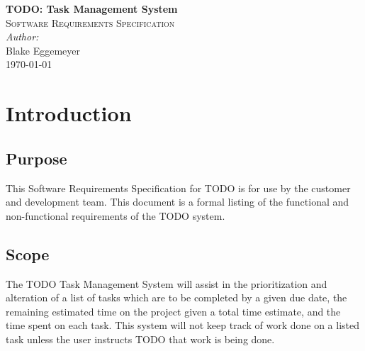 \documentclass[12pt,a4paper]{article}
\begin{document}
\begin{titlepage}
\begin{flushright} 
{ \huge \bfseries TODO: Task Management System}\\[4cm]
\textsc{\Large Software Requirements Specification}\\
\vfill
\emph{Author:} \\
Blake Eggemeyer \\ [7cm]
{\large \today}
\end{flushright}
\end{titlepage}
\setcounter{tocdepth}{3}
\tableofcontents
\newpage
\section{Introduction}
\subsection{Purpose}
This Software Requirements Specification for TODO is for use by the customer and development team. This document is a formal listing of the functional and non-functional requirements of the TODO system.
\subsection{Scope}
The TODO Task Management System will assist in the prioritization and alteration of a list of tasks which are to be completed by a given due date, the remaining estimated time on the project given a total time estimate, and the time spent on each task. This system will not keep track of work done on a listed task unless the user instructs TODO that work is being done.
\end{document}
